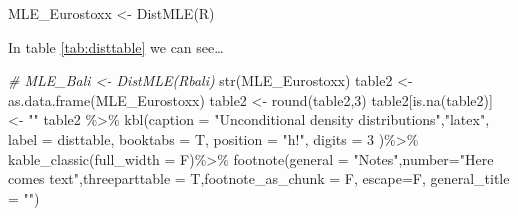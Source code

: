 \documentclass[a4paper, twoside]{templates/ociamthesis}
\newenvironment{Shaded}{\begin{snugshade}}{\end{snugshade}}
\newcommand{\AttributeTok}[1]{\textcolor[rgb]{0.77,0.63,0.00}{#1}}
\newcommand{\CommentTok}[1]{\textcolor[rgb]{0.56,0.35,0.01}{\textit{#1}}}
\newcommand{\ControlFlowTok}[1]{\textcolor[rgb]{0.13,0.29,0.53}{\textbf{#1}}}
\newcommand{\DecValTok}[1]{\textcolor[rgb]{0.00,0.00,0.81}{#1}}
\newcommand{\FunctionTok}[1]{\textcolor[rgb]{0.00,0.00,0.00}{#1}}
\newcommand{\NormalTok}[1]{#1}
\newcommand{\OtherTok}[1]{\textcolor[rgb]{0.56,0.35,0.01}{#1}}
\newcommand{\SpecialCharTok}[1]{\textcolor[rgb]{0.00,0.00,0.00}{#1}}
\newcommand{\StringTok}[1]{\textcolor[rgb]{0.31,0.60,0.02}{#1}}
\renewenvironment{Shaded}
{
  \vspace{10pt}%
  \begin{snugshade}%
}{%
  \end{snugshade}%
  \vspace{8pt}%
}
\begin{document}
\begin{Shaded}
\end{Shaded}

\begin{Shaded}
\begin{Highlighting}[]
\NormalTok{MLE\_Eurostoxx }\OtherTok{\textless{}{-}} \FunctionTok{DistMLE}\NormalTok{(R)}
\end{Highlighting}
\end{Shaded}

In table \ref{tab:disttable} we can see\ldots{}

\begin{Shaded}
\begin{Highlighting}[]
\CommentTok{\# MLE\_Bali \textless{}{-} DistMLE(Rbali)}
\FunctionTok{str}\NormalTok{(MLE\_Eurostoxx)}
\NormalTok{table2 }\OtherTok{\textless{}{-}} \FunctionTok{as.data.frame}\NormalTok{(MLE\_Eurostoxx)}
\NormalTok{table2 }\OtherTok{\textless{}{-}} \FunctionTok{round}\NormalTok{(table2,}\DecValTok{3}\NormalTok{)}
\NormalTok{table2[}\FunctionTok{is.na}\NormalTok{(table2)] }\OtherTok{\textless{}{-}} \StringTok{""} 
\NormalTok{table2 }\SpecialCharTok{\%\textgreater{}\%} \FunctionTok{kbl}\NormalTok{(}\AttributeTok{caption =} \StringTok{"Unconditional density distributions"}\NormalTok{,}\StringTok{"latex"}\NormalTok{,}
      \AttributeTok{label =} \StringTok{\textquotesingle{}disttable\textquotesingle{}}\NormalTok{,}
      \AttributeTok{booktabs =}\NormalTok{ T,}
      \AttributeTok{position =} \StringTok{"h!"}\NormalTok{,}
      \AttributeTok{digits =} \DecValTok{3}\NormalTok{ )}\SpecialCharTok{\%\textgreater{}\%}
  \FunctionTok{kable\_classic}\NormalTok{(}\AttributeTok{full\_width =}\NormalTok{ F)}\SpecialCharTok{\%\textgreater{}\%} 
  \FunctionTok{footnote}\NormalTok{(}\AttributeTok{general =} \StringTok{"Notes"}\NormalTok{,}\AttributeTok{number=}\StringTok{"Here comes text"}\NormalTok{,}\AttributeTok{threeparttable =}\NormalTok{ T,}\AttributeTok{footnote\_as\_chunk =}\NormalTok{ F, }\AttributeTok{escape=}\NormalTok{F, }\AttributeTok{general\_title =} \StringTok{""}\NormalTok{) }
\end{Highlighting}
\end{Shaded}
\end{document}
